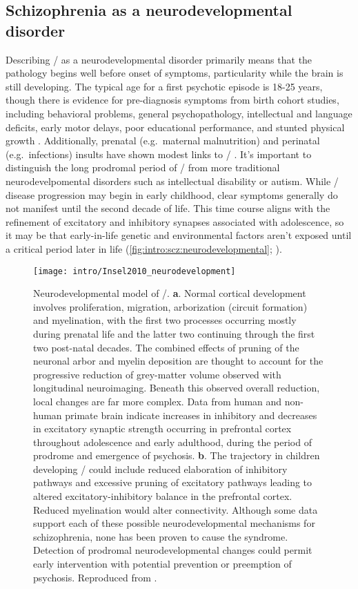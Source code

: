 \subsection{Schizophrenia as a neurodevelopmental disorder}
\label{sec:intro:scz:neurodevelopment}
Describing \scz/ as a neurodevelopmental disorder primarily means that the pathology begins well before onset of symptoms, particularity while the brain is still developing.
The typical age for a first psychotic episode is 18-25 years, though there is evidence for pre-diagnosis symptoms from birth cohort studies, including behavioral problems, general psychopathology, intellectual and language deficits, early motor delays, poor educational performance, and stunted physical growth \citep{Welham2009}.
Additionally, prenatal (e.g.~maternal malnutrition) and perinatal (e.g.~infections) insults have shown modest links to \scz/ \citep{Lewis2002}.
It's important to distinguish the long prodromal period of \scz/ from more traditional neurodevelpomental disorders such as intellectual disability or autism.
While \scz/ disease progression may begin in early childhood, clear symptoms generally do not manifest until the second decade of life.
This time course aligns with the refinement of excitatory and inhibitory synapses associated with adolescence, so it may be that early-in-life genetic and environmental factors aren't exposed until a critical period later in life (\autoref{fig:intro:scz:neurodevelopmental}; \citealp{Insel2010a}).

\begin{figure}
	\centering
	\texttt{[image: intro/Insel2010\_neurodevelopment]}
	\caption[Neurodevelopmental model of \scz/]{Neurodevelopmental model of \scz/.
	\textbf{a}. Normal cortical development involves proliferation, migration, arborization (circuit formation) and myelination, with the first two processes occurring mostly during prenatal life and the latter two continuing through the first two post-natal decades. The combined effects of pruning of the neuronal arbor and myelin deposition are thought to account for the progressive reduction of grey-matter volume observed with longitudinal neuroimaging. Beneath this observed overall reduction, local changes are far more complex. Data from human and non-human primate brain indicate increases in inhibitory and decreases in excitatory synaptic strength occurring in prefrontal cortex throughout adolescence and early adulthood, during the period of prodrome and emergence of psychosis.
	\textbf{b}. The trajectory in children developing \scz/ could include reduced elaboration of inhibitory pathways and excessive pruning of excitatory pathways leading to altered excitatory-inhibitory balance in the prefrontal cortex. Reduced myelination would alter connectivity. Although some data support each of these possible neurodevelopmental mechanisms for schizophrenia, none has been proven to cause the syndrome. Detection of prodromal neurodevelopmental changes could permit early intervention with potential prevention or preemption of psychosis.
	Reproduced from \citet{Insel2010a}.}
	\label{fig:intro:scz:neurodevelopmental}
\end{figure}

